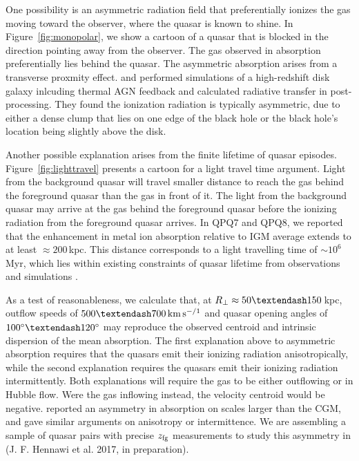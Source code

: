 \documentclass[iop]{emulateapj}
\begin{document}
One possibility is an asymmetric radiation field that preferentially ionizes the gas moving toward 
the observer, where the quasar is known to shine. In Figure~\ref{fig:monopolar}, we show a cartoon 
of a quasar that is blocked in the direction pointing away from the observer. The gas 
observed in absorption preferentially lies behind the quasar. The asymmetric absorption arises 
from a transverse proxmity effect. 
\cite{Roos+15} and \cite{GaborBournaud14} performed simulations of a high-redshift disk galaxy 
inlcuding thermal AGN feedback and calculated radiative transfer in post-processing. They found 
the ionization radiation is typically asymmetric, due to either a dense clump that lies on one 
edge of the black hole or the black hole's location being slightly above the disk. 

Another possible explanation arises from the finite lifetime of quasar episodes. 
Figure~\ref{fig:lighttravel} presents a cartoon for a light travel time argument. Light from the 
background quasar will travel smaller distance to reach the gas behind the foreground quasar 
than the gas in front of it. The light from the background quasar may arrive at the gas behind 
the foreground quasar before the ionizing radiation from the foreground quasar arrives. In 
QPQ7 and QPQ8, we reported that the enhancement in metal ion absorption relative to IGM average 
extends to at least $\approx200$\,kpc. This distance corresponds to a light travelling time of 
$\sim10^6$\,Myr, which lies within existing constraints of quasar lifetime from observations 
\citep[e.g.][]{Martini04} and simulations \citep[e.g.][]{Hopkins+05}. 

As a test of reasonableness, we calculate that, at $R_\perp\approx50\textendash150$\,kpc, 
outflow speeds of $500\textendash700\,{\rm km\,s^{-/1}}$ and quasar opening angles of 
$100^\circ\textendash120^\circ$ may reproduce the observed centroid and intrinsic dispersion of 
the  mean absorption. 
The first explanation above to asymmetric absorption requires that the quasars emit their ionizing 
radiation anisotropically, while the second explanation requires the quasars emit their ionizing 
radiation intermittently. Both explanations will require the gas to be either outflowing or in 
Hubble flow. Were the gas inflowing instead, the velocity centroid would be negative. 
\cite{KirkmanTytler08} reported an asymmetry in  absorption on scales larger than 
the CGM, and gave similar arguments on anisotropy or intermittence. We are assembling a sample of 
quasar pairs with precise 
$z_{\rm fg}$ measurements to study this asymmetry in  (J. F. Hennawi et al. 2017, in 
preparation). 
\end{document}
